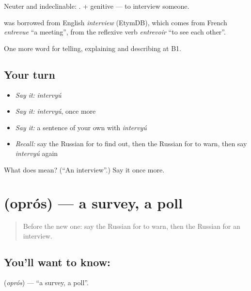 Neuter and indeclinable: \emph{ }. \emph{  } + genitive — to interview someone.

\begin{cousinweb}
\emph{} was borrowed from English \emph{interview} (EtymDB), which comes from French \emph{entrevue} \textquotedblleft{}a meeting\textquotedblright{}, from the reflexive verb \emph{entrevoir} \textquotedblleft{}to see each other\textquotedblright{}.
\end{cousinweb}

\begin{grammarlens}[title={What you've built}]
One more word for telling, explaining and describing at B1.
\end{grammarlens}

\subsection*{Your turn}
\begin{itemize}
\raggedright
  \item \emph{Say it:} \emph{intervyú}
  \item \emph{Say it:} \emph{intervyú}, once more
  \item \emph{Say it:} a sentence of your own with \emph{intervyú}
  \item \emph{Recall:} say the Russian for to find out, then the Russian for to warn, then say \emph{intervyú} again
\end{itemize}

\begin{tcolorbox}[breakable,colback=teal!4,colframe=teal!35!black,title={Before you move on}]
What does  mean? (\textquotedblleft{}An interview\textquotedblright{}.) Say it once more.
\end{tcolorbox}
\section[\texorpdfstring{\ru{опрос} (oprós)}{опрос (oprós)}]{ (oprós) — a survey, a poll}

\label{lesson:RU-C284-opros}



\begin{quote}
Before the new one: say the Russian for to warn, then the Russian for an interview.
\end{quote}

\subsection*{You'll want to know: }
\textbf{} (\emph{oprós}) — \textquotedblleft{}a survey, a poll\textquotedblright{}.

